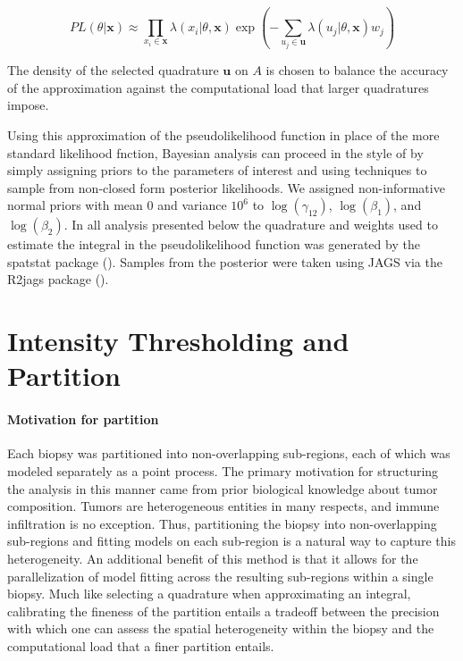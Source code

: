 \documentclass[
]{book}
\begin{document}
\begin{equation}
\label{eqn:PL_approx}
PL(\theta | {\mathbf{x}}) \approx
\prod_{x_i \in {\mathbf{x}}} \lambda(x_i | \theta, {\mathbf{x}}) \exp(-\sum_{u_j \in {\mathbf{u}}} \lambda(u_j | \theta, {\mathbf{x}}) w_j) \tag{4}
\end{equation}

The density of the selected quadrature \({\mathbf{u}}\) on \(A\) is chosen to balance the accuracy of the approximation against the computational load that larger quadratures impose.

Using this approximation of the pseudolikelihood function in place of the more standard likelihood fnction, Bayesian analysis can proceed in the style of \citet{King12} by simply assigning priors to the parameters of interest and using techniques to sample from non-closed form posterior likelihoods. We assigned non-informative normal priors with mean 0 and variance \(10^6\) to \(\log(\gamma_{12})\), \(\log(\beta_1)\), and \(\log(\beta_2)\). In all analysis presented below the quadrature and weights used to estimate the integral in the pseudolikelihood function was generated by the spatstat package (\citet{BT05}). Samples from the posterior were taken using JAGS via the R2jags package
(\citet{Su15}).

\hypertarget{intensity-thresholding-and-partition}{%
\section{Intensity Thresholding and Partition}\label{intensity-thresholding-and-partition}}

\paragraph{\textbf{Motivation for partition}}

Each biopsy was partitioned into non-overlapping sub-regions,
each of which was modeled separately as a point process. The
primary motivation for structuring the analysis in this manner
came from prior biological knowledge about tumor composition.
Tumors are heterogeneous entities in many respects, and
immune infiltration is no exception. Thus, partitioning
the biopsy into non-overlapping sub-regions and fitting models
on each sub-region is a natural way to capture this heterogeneity.
An additional benefit of this method is that it allows for the
parallelization of model fitting across the resulting sub-regions
within a single biopsy. Much like selecting a quadrature when approximating
an integral, calibrating the fineness of the partition entails a
tradeoff between the precision with which one can assess the
spatial heterogeneity within the biopsy and the computational
load that a finer partition entails.
\end{document}

